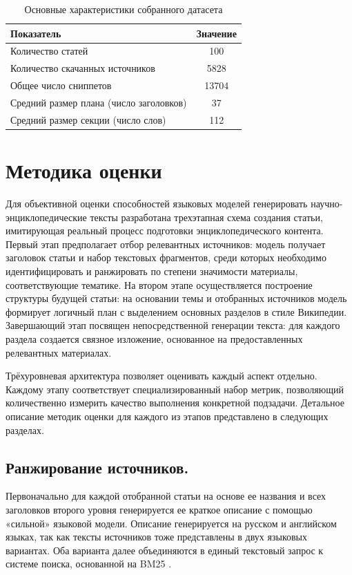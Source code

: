 \documentclass{article}
\theoremstyle{definition}
\theoremstyle{plain}
\begin{document}
\begin{table}[htb]
  \centering
  \caption{Основные характеристики собранного датасета}
  \label{tab:dataset}
  \begin{tabular}{lc}
    \hline
    \textbf{Показатель} & \textbf{Значение} \\
    \hline
    Количество статей                             & 100    \\
    \hline
    Количество скачанных источников               & 5828  \\
    \hline
    Общее число сниппетов                         & 13704  \\
    \hline
    Средний размер плана (число заголовков)       & 37    \\
    \hline
    Средний размер секции (число слов)            & 112   \\
    \hline
  \end{tabular}
\end{table}


\section*{Методика оценки}
Для объективной оценки способностей языковых моделей генерировать научно-энциклопедические тексты разработана трехэтапная схема создания статьи, имитирующая реальный процесс подготовки энциклопедического контента. 
Первый этап предполагает отбор релевантных источников: модель получает заголовок статьи и набор текстовых фрагментов, среди которых необходимо идентифицировать и ранжировать по степени значимости материалы, соответствующие тематике. 
На втором этапе осуществляется построение структуры будущей статьи: на основании темы и отобранных источников модель формирует логичный план с выделением основных разделов в стиле Википедии. 
Завершающий этап посвящен непосредственной генерации текста: для каждого раздела создается связное изложение, основанное на предоставленных релевантных материалах. 

Трёхуровневая архитектура позволяет оценивать каждый аспект отдельно.
Каждому этапу соответствует специализированный набор метрик, позволяющий количественно измерить качество выполнения конкретной подзадачи. 
Детальное описание методик оценки для каждого из этапов представлено в следующих разделах.
\subsection*{Ранжирование источников.}
Первоначально для каждой отобранной статьи на основе ее названия и всех заголовков второго уровня генерируется ее краткое описание с помощью «сильной» языковой модели. 
Описание генерируется на русском и английском языках, так как тексты источников тоже представлены в двух языковых вариантах. 
Оба варианта далее объединяются в единый текстовый запрос к системе поиска, основанной на BM25 . 
\end{document}
